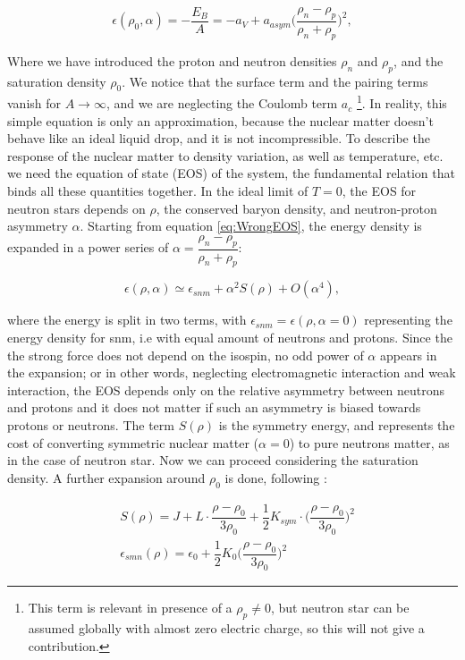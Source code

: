 \begin{equation} \label{eq:WrongEOS}
\epsilon (\rho_{0}, \alpha) = -\frac{E_{B}}{A} = -a_{V} + a_{asym} \bigl(\dfrac{\rho_{n} - \rho_{p}}{\rho_{n} + \rho_{p}} \bigl)^{2} ,
\end{equation}

Where we have introduced the proton and neutron densities $\rho_{n}$ and $\rho_{p}$, and the saturation density $\rho_{0}$. We notice that the surface term and the pairing terms vanish for $A \rightarrow \infty$, and we are neglecting the Coulomb term $a_{c}$ \footnote{This term is relevant in presence of a $\rho_{p} \neq 0 $, but neutron star can be assumed globally with almost zero electric charge, so this will not give a contribution.}.
In reality, this simple equation is only an approximation, because the nuclear matter doesn't behave like an ideal liquid drop, and it is not incompressible. To describe the response of the nuclear matter to density variation, as well as temperature, etc. we need the equation of state (EOS) of the system, the fundamental relation that binds all these quantities together. In the ideal limit of $T = 0$, the EOS for neutron stars depends on $\rho$, the conserved baryon density, and neutron-proton asymmetry $\alpha$. Starting from equation \ref{eq:WrongEOS}, the energy density is expanded in a power series of $\alpha = \dfrac{\rho_{n} - \rho_{p}}{\rho_{n} + \rho_{p}}$:

\begin{equation}
\epsilon (\rho,\alpha) \simeq \epsilon_{snm} + \alpha ^{2} S(\rho) + O(\alpha ^{4}) ,
\end{equation}

where the energy is split in two terms, with $\epsilon_{snm} = \epsilon (\rho, \alpha = 0)$ representing the energy density for snm, i.e with equal amount of neutrons and protons. Since the the strong force does not depend on the isospin, no odd power of $\alpha$ appears in the expansion; or in other words, neglecting electromagnetic interaction and weak interaction, the EOS depends only on the relative asymmetry between neutrons and protons and it does not matter if such an asymmetry is biased towards protons or neutrons. The term $S(\rho)$ is the symmetry energy, and represents the cost of converting symmetric nuclear matter ($\alpha = 0$) to pure neutrons matter, as in the case of neutron star. Now we can proceed considering the saturation density. A further expansion around $\rho_{0}$ is done, following \cite{Piekarewicz_2009}:
	
\begin{equation} \label{eq:Lfirst}
\begin{split}
& S(\rho) = J + L \cdot \dfrac{\rho - \rho_{0}}{3 \rho_{0}} + \dfrac{1}{2} K_{sym} \cdot \biggl(\dfrac{\rho - \rho_{0}}{3 \rho_{0}}\biggl)^{2} \\
& \epsilon _{smn} (\rho) = \epsilon_{0} + \dfrac{1}{2}K_{0} \biggl(\dfrac{\rho - \rho_{0}}{3 \rho_{0}} \biggl)^{2} 
\end{split}
\end{equation}

